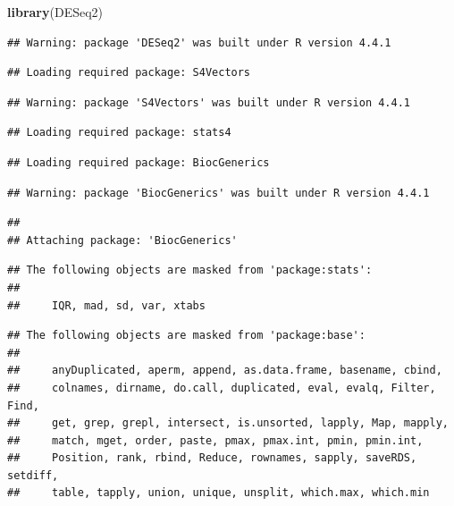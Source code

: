\documentclass[
]{article}
\newenvironment{Shaded}{\begin{snugshade}}{\end{snugshade}}
\newcommand{\FunctionTok}[1]{\textcolor[rgb]{0.13,0.29,0.53}{\textbf{#1}}}
\newcommand{\NormalTok}[1]{#1}
\begin{document}
\begin{Shaded}
\begin{Highlighting}[]
\FunctionTok{library}\NormalTok{(DESeq2)}
\end{Highlighting}
\end{Shaded}

\begin{verbatim}
## Warning: package 'DESeq2' was built under R version 4.4.1
\end{verbatim}

\begin{verbatim}
## Loading required package: S4Vectors
\end{verbatim}

\begin{verbatim}
## Warning: package 'S4Vectors' was built under R version 4.4.1
\end{verbatim}

\begin{verbatim}
## Loading required package: stats4
\end{verbatim}

\begin{verbatim}
## Loading required package: BiocGenerics
\end{verbatim}

\begin{verbatim}
## Warning: package 'BiocGenerics' was built under R version 4.4.1
\end{verbatim}

\begin{verbatim}
## 
## Attaching package: 'BiocGenerics'
\end{verbatim}

\begin{verbatim}
## The following objects are masked from 'package:stats':
## 
##     IQR, mad, sd, var, xtabs
\end{verbatim}

\begin{verbatim}
## The following objects are masked from 'package:base':
## 
##     anyDuplicated, aperm, append, as.data.frame, basename, cbind,
##     colnames, dirname, do.call, duplicated, eval, evalq, Filter, Find,
##     get, grep, grepl, intersect, is.unsorted, lapply, Map, mapply,
##     match, mget, order, paste, pmax, pmax.int, pmin, pmin.int,
##     Position, rank, rbind, Reduce, rownames, sapply, saveRDS, setdiff,
##     table, tapply, union, unique, unsplit, which.max, which.min
\end{verbatim}
\end{document}

